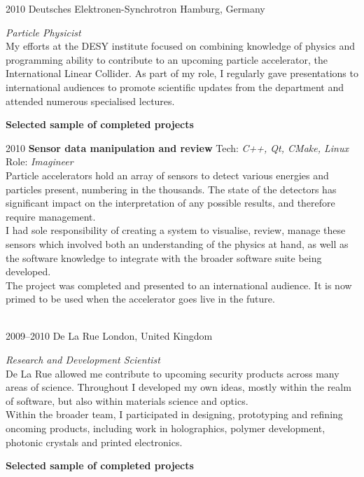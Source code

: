 \documentclass[]{friggeri-cv} %
\begin{document}
\begin{entrylist}
\entry
{2010}
{\LARGE{Deutsches Elektronen-Synchrotron}}
{Hamburg, Germany}
{\emph{Particle Physicist} \\
My efforts at the DESY  institute focused on combining knowledge of physics and programming ability to contribute to an upcoming particle accelerator, the International Linear Collider. As part of my role, I regularly gave presentations to international audiences to promote scientific updates from the department and attended numerous specialised lectures. \\
\centerline{\textbf{Selected sample of completed projects}}} 

\entry
{2010}
{\textbf{Sensor data manipulation and review}}
{}
{Tech: \emph{C++, Qt, CMake, Linux} \hfill Role: \emph{Imagineer} \\
Particle accelerators hold an array of sensors to detect various energies and particles present, numbering in the thousands. The state of the detectors has significant impact on the interpretation of any possible results, and therefore require management.\\
I had sole responsibility of creating a system to visualise, review, manage these sensors which involved both an understanding of the physics at hand, as well as the software knowledge to integrate with the broader software suite being developed. \\
The project was completed and presented to an international audience. It is now primed to be used when the accelerator goes live in the future.
}

\\
\entry
{2009--2010}
{\LARGE{De La Rue}}
{London, United Kingdom}
{\emph{Research and Development Scientist} \\
De La Rue allowed me contribute to upcoming security
products across many areas of science. Throughout I developed my own ideas, mostly within the realm of software, but also within materials science and optics. \\
Within the broader team, I participated in designing, prototyping and refining oncoming products, including  work in holographics, polymer development, photonic crystals and printed electronics. \\
\centerline{\textbf{Selected sample of completed projects}}}


\end{entrylist}
\end{document}
